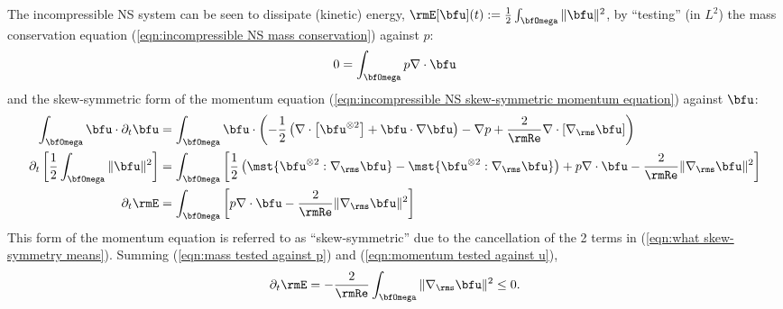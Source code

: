     The incompressible NS system can be seen to dissipate (kinetic) energy, $\rmE[\bfu](t)  :=  \frac{1}{2}\int_{\bfOmega}\|\bfu\|^{2}$, by ``testing'' (in $L^{2}$) the mass conservation equation (\ref{eqn:incompressible NS mass conservation}) against $p$:
    \begin{equation}\label{eqn:mass tested against p}
        0  =  \int_{\bfOmega}p\nabla\cdot\bfu
    \end{equation}
    and the skew-symmetric form of the momentum equation (\ref{eqn:incompressible NS skew-symmetric momentum equation}) against $\bfu$:
    \begin{align}
        \int_{\bfOmega}\bfu\cdot\partial_{t}\bfu  &=  \int_{\bfOmega}\bfu\cdot\left(- \frac{1}{2}\left(\nabla\cdot\left[\bfu^{\otimes 2}\right] + \bfu\cdot\nabla\bfu\right) - \nabla p + \frac{2}{\rmRe}\nabla\cdot[\nabla_{\rms}\bfu]\right)  \\
        \partial_{t}\left[\frac{1}{2}\int_{\bfOmega}\|\bfu\|^{2}\right]  &=  \int_{\bfOmega}\left[\frac{1}{2}\left(\mst{\bfu^{\otimes 2}:\nabla_{\rms}\bfu} - \mst{\bfu^{\otimes 2}:\nabla_{\rms}\bfu}\right) + p\nabla\cdot\bfu - \frac{2}{\rmRe}\|\nabla_{\rms}\bfu\|^{2}\right]  \label{eqn:what skew-symmetry means}  \\
        \partial_{t}\rmE  &=  \int_{\bfOmega}\left[p\nabla\cdot\bfu - \frac{2}{\rmRe}\|\nabla_{\rms}\bfu\|^{2}\right]  \label{eqn:momentum tested against u}
    \end{align}
    This form of the momentum equation is referred to as ``skew-symmetric'' due to the cancellation of the 2 terms in (\ref{eqn:what skew-symmetry means}). Summing (\ref{eqn:mass tested against p}) and (\ref{eqn:momentum tested against u}),
    \begin{equation}
        \partial_{t}\rmE  =  - \frac{2}{\rmRe}\int_{\bfOmega}\|\nabla_{\rms}\bfu\|^{2}  \leq  0.
    \end{equation}

